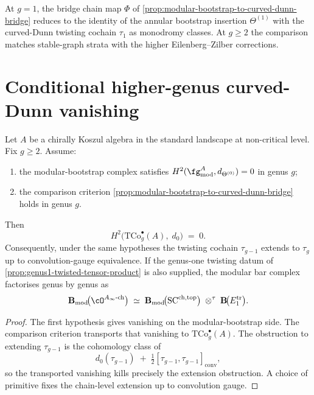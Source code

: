 \begin{remark}[Bridge at \(g = 1\)]
\label{rem:bridge-at-genus-1}
At \(g = 1\), the bridge chain map \(\Phi\) of
\autoref{prop:modular-bootstrap-to-curved-dunn-bridge} reduces to
the identity of the annular bootstrap insertion \(\Theta^{(1)}\)
with the curved-Dunn twisting cochain \(\tau_{1}\) as monodromy
classes. At \(g \ge 2\) the comparison matches stable-graph strata
with the higher Eilenberg--Zilber corrections.
\end{remark}

\section{Conditional higher-genus curved-Dunn vanishing}
\label{sec:curved-dunn-vanishing}

\begin{theorem}
\label{thm:curved-dunn-H2-vanishing-all-genera}
Let \(A\) be a chirally Koszul algebra in the standard landscape at
non-critical level. Fix \(g \ge 2\). Assume:
\begin{enumerate}
 \item the modular-bootstrap complex satisfies
 \(H^{2}(\fg^{A}_{\mathrm{mod}}, d_{\Theta^{(0)}})=0\) in genus
 \(g\);
 \item the comparison criterion
 \autoref{prop:modular-bootstrap-to-curved-dunn-bridge} holds in
 genus \(g\).
\end{enumerate}
Then
\[
 H^{2}\bigl(\mathrm{TCo}^{\bullet}_{g}(A),\; d_{0}\bigr)
 \;=\;
 0.
\]
Consequently, under the same hypotheses the twisting cochain
\(\tau_{g-1}\) extends to \(\tau_{g}\) up to convolution-gauge
equivalence. If the genus-one twisting datum of
\autoref{prop:genus1-twisted-tensor-product} is also supplied, the
modular bar complex factorises genus by genus as
\[
 \mathbf{B}_{\mathrm{mod}}\!\bigl(\cO^{A_{\infty}\text{-ch}}\bigr)
 \;\simeq\;
 \mathbf{B}_{\mathrm{mod}}\!\bigl(\mathrm{SC}^{\mathrm{ch,top}}\bigr)
 \;\otimes^{\tau}\;
 \mathbf{B}\!\bigl(E_{1}^{\mathrm{tr}}\bigr).
\]
\end{theorem}

\begin{proof}
The first hypothesis gives vanishing on the modular-bootstrap side.
The comparison criterion transports that vanishing to
\(\mathrm{TCo}^{\bullet}_{g}(A)\). The obstruction to extending
\(\tau_{g-1}\) is the cohomology class of
\[
d_{0}(\tau_{g-1})
\;+\;\tfrac{1}{2}[\tau_{g-1},\tau_{g-1}]_{\mathrm{conv}},
\]
so the transported vanishing kills precisely the extension
obstruction. A choice of primitive fixes the chain-level extension
up to convolution gauge.
\end{proof}

